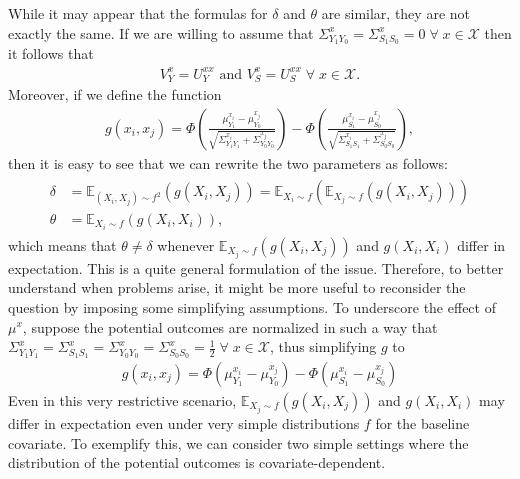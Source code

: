 \documentclass[12pt]{article}
\newcommand{\E}{\mathbb{E}}
\begin{document}
While it may appear that the formulas for \(\delta\) and \(\theta\) are similar, they are not exactly the same. If we are willing to assume that \( \Sigma^{x}_{Y_{1} Y_{0}} = \Sigma^{x}_{S_{1} S_{0}} = 0 \; \forall \; x \in \mathcal{X} \) then it follows that
\begin{align}
  V^{x}_{Y} = U^{x x}_{Y} \text{ and } V^{x}_{S} = U^{x x}_{S} \; \forall \; x \in \mathcal{X}.
\end{align}
Moreover, if we define the function
\begin{align}
    g(x_{i}, x_{j}) = \Phi \left( \frac{\mu^{x_{i}}_{Y_{1}} - \mu^{x_{j}}_{Y_{0}}}{\sqrt{\Sigma^{x_{i}}_{Y_{1} Y_{1}} + \Sigma^{x_{j}}_{Y_{0} Y_{0}}}} \right) - \Phi \left( \frac{\mu^{x_{i}}_{S_{1}} - \mu^{x_{j}}_{S_{0}}}{\sqrt{\Sigma^{x_{i}}_{S_{1} S_{1}} + \Sigma^{x_{j}}_{S_{0} S_{0}}}} \right),
\end{align}
then it is easy to see that we can rewrite the two parameters as follows:
\begin{align}
    \begin{split}
        \delta & = \E_{(X_{i}, X_{j}) \sim f^{2}} \left( g(X_{i}, X_{j})\right) = \E_{X_{i} \sim f} \left( \E_{X_{j} \sim f} \left( g(X_{i}, X_{j}) \right) \right) \\
        \theta & = \E_{X_{i} \sim f} \left( g(X_{i}, X_{i}) \right),
    \end{split}
\end{align}
which means that \(\theta \neq \delta\) whenever \(\E_{X_{j} \sim f} \left( g(X_{i}, X_{j}) \right) \) and \(g(X_{i}, X_{i})\) differ in expectation. This is a quite general formulation of the issue. Therefore, to better understand when problems arise, it might be more useful to reconsider the question by imposing some simplifying assumptions. To underscore the effect of \(\mu^{x}\), suppose the potential outcomes are normalized in such a way that \(\Sigma^{x}_{Y_{1} Y_{1}} = \Sigma^{x}_{S_{1} S_{1}} = \Sigma^{x}_{Y_{0} Y_{0}} = \Sigma^{x}_{S_{0} S_{0}} = \frac{1}{2} \; \forall \; x \in \mathcal{X} \), thus simplifying \(g\) to
\begin{align}
    g(x_{i}, x_{j}) = \Phi \left( \mu^{x_{i}}_{Y_{1}} - \mu^{x_{j}}_{Y_{0}} \right) - \Phi \left( \mu^{x_{i}}_{S_{1}} - \mu^{x_{j}}_{S_{0}} \right)
\end{align}
Even in this very restrictive scenario, \(\E_{X_{j} \sim f} \left( g(X_{i}, X_{j}) \right) \) and \(g(X_{i}, X_{i})\) may differ in expectation even under very simple distributions \(f\) for the baseline covariate. To exemplify this, we can consider two simple settings where the distribution of the potential outcomes is covariate-dependent.
\end{document}
